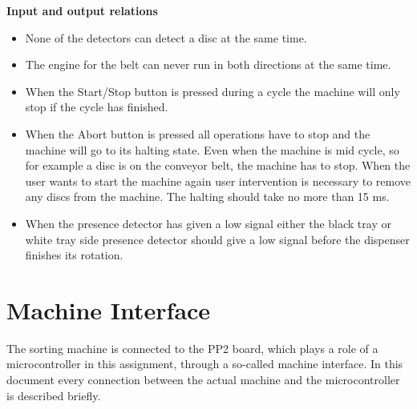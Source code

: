 \documentclass[a4paper,oneside,11pt]{report}
\begin{document}
\textbf{Input and output relations}
\begin{itemize}
\item None of the detectors can detect a disc at the same time.
\item The engine for the belt can never run in both directions at the same time.
\item When the Start/Stop button is pressed during a cycle the machine will only stop if the cycle has finished.
\item When the Abort button is pressed all operations have to stop and the machine will go to its halting state. Even when the machine is mid cycle, so for example a disc is on the conveyor belt, the machine has to stop. When the user wants to start the machine again user intervention is necessary to remove any discs from the machine. The halting should take no more than 15 ms.
\item When the presence detector has given a low signal either the black tray or white tray side presence detector should give a low signal before the dispenser finishes its rotation.
\end{itemize}

\newpage

\section{Machine Interface}
The sorting machine is connected to the PP2 board, which plays a role of a microcontroller in this assignment, through a so-called machine interface. In this document every connection between the actual machine and the microcontroller is described briefly.
\end{document}
